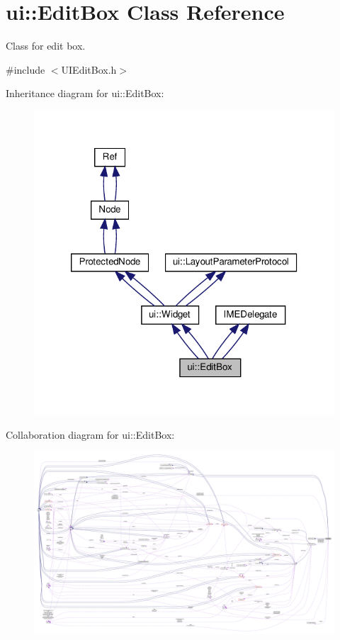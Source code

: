\hypertarget{classui_1_1EditBox}{}\section{ui\+:\+:Edit\+Box Class Reference}
\label{classui_1_1EditBox}


Class for edit box.  




{\ttfamily \#include $<$U\+I\+Edit\+Box.\+h$>$}



Inheritance diagram for ui\+:\+:Edit\+Box\+:
\nopagebreak
\begin{figure}[H]
\begin{center}
\leavevmode
\includegraphics[width=320pt]{classui_1_1EditBox__inherit__graph}
\end{center}
\end{figure}


Collaboration diagram for ui\+:\+:Edit\+Box\+:
\nopagebreak
\begin{figure}[H]
\begin{center}
\leavevmode
\includegraphics[width=350pt]{classui_1_1EditBox__coll__graph}
\end{center}
\end{figure}

